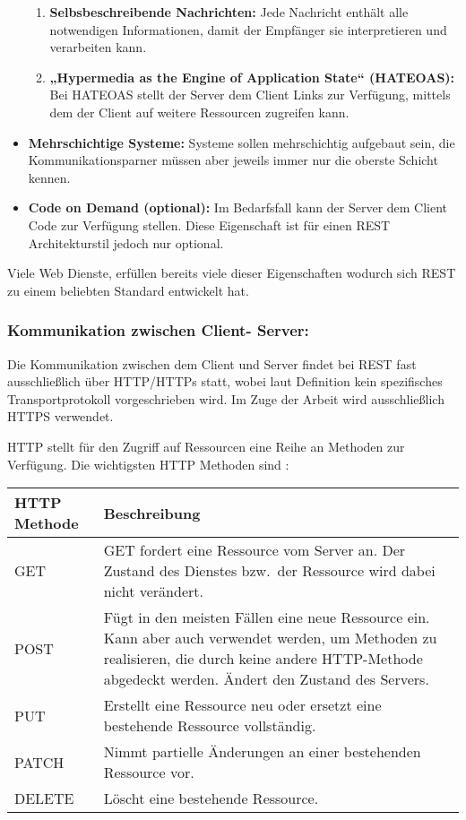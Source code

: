 \begin{itemize}
\begin{enumerate}
		\item \textbf{Selbsbeschreibende Nachrichten:}
		Jede Nachricht enthält alle notwendigen Informationen, damit der Empfänger sie interpretieren und verarbeiten kann.
		
		\item \textbf{„Hypermedia as the Engine of Application State“ (HATEOAS):} 
		Bei HATEOAS stellt der Server dem Client Links zur Verfügung, mittels dem der Client auf weitere Ressourcen zugreifen kann.
	\end{enumerate}
	
	\item \textbf{Mehrschichtige Systeme:}
	Systeme sollen mehrschichtig aufgebaut sein, die Kommunikationsparner müssen aber jeweils immer nur die oberste Schicht kennen.
	
	\item \textbf{Code on Demand (optional):}
	Im Bedarfsfall kann der Server dem Client Code zur Verfügung stellen. Diese Eigenschaft ist für einen REST Architekturstil jedoch nur optional.
\end{itemize} 
\parencite{fielding2000rest}

Viele Web Dienste, erfüllen bereits viele dieser Eigenschaften wodurch sich REST zu einem beliebten Standard entwickelt hat.

\clearpage

\subsubsection*{Kommunikation zwischen Client- Server:}
Die Kommunikation zwischen dem Client und Server findet bei REST fast ausschließlich über HTTP/HTTPs statt, wobei laut Definition kein spezifisches Transportprotokoll vorgeschrieben wird. Im Zuge der Arbeit wird ausschließlich HTTPS verwendet.

HTTP stellt für den Zugriff auf Ressourcen eine Reihe an Methoden zur Verfügung. Die wichtigsten HTTP Methoden sind : \newline

\begin{tabularx}{\textwidth}{|l|X|}
	\hline
	\textbf{HTTP Methode} & \textbf{Beschreibung} \\
	\hline
	GET & GET fordert eine Ressource vom Server an. Der Zustand des Dienstes bzw.\ der Ressource wird dabei nicht verändert. \\
	\hline
	POST & Fügt in den meisten Fällen eine neue Ressource ein. Kann aber auch verwendet werden, um Methoden zu realisieren, die durch keine andere HTTP-Methode abgedeckt werden. Ändert den Zustand des Servers. \\
	\hline
PUT & Erstellt eine Ressource neu oder ersetzt eine bestehende Ressource vollständig. \\
\hline
PATCH & Nimmt partielle Änderungen an einer bestehenden Ressource vor. \\
	\hline
	DELETE & Löscht eine bestehende Ressource. \\
	\hline
\end{tabularx} \newline


